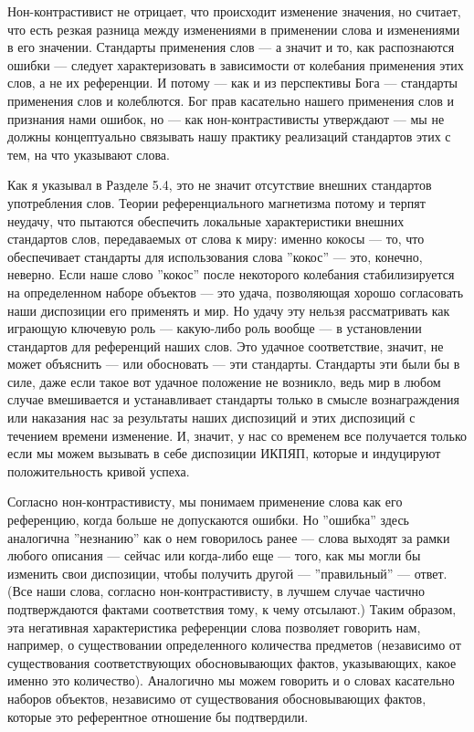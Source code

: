 \documentclass[11pt]{book}
\begin{document}
Нон-контрастивист не отрицает, что происходит изменение значения, но считает, что есть резкая разница между изменениями в применении слова и изменениями в его значении. Стандарты применения слов --- а значит и то, как распознаются ошибки --- следует характеризовать в зависимости от колебания применения этих слов, а не их референции. И потому --- как и из перспективы Бога --- стандарты применения слов и колеблются. Бог прав касательно нашего применения слов и признания нами ошибок, но --- как нон-контрастивисты утверждают --- мы не должны концептуально связывать нашу практику реализаций стандартов этих с тем, на что указывают слова.

Как я указывал в Разделе 5.4, это не значит отсутствие внешних стандартов употребления слов. Теории референциального магнетизма потому и терпят неудачу, что пытаются обеспечить локальные характеристики внешних стандартов слов, передаваемых от слова к миру: именно кокосы --- то, что обеспечивает стандарты для использования слова ''кокос'' --- это, конечно, неверно. Если наше слово ''кокос'' после некоторого колебания стабилизируется на определенном наборе объектов --- это удача, позволяющая хорошо согласовать наши диспозиции его применять и мир. Но удачу эту нельзя рассматривать как играющую ключевую роль --- какую-либо роль вообще --- в установлении стандартов для референций наших слов. Это удачное соответствие, значит, не может объяснить --- или обосновать --- эти стандарты. Стандарты эти были бы в силе, даже если такое вот удачное положение не возникло, ведь мир в любом случае вмешивается и устанавливает стандарты только в смысле вознаграждения или наказания нас за результаты наших диспозиций и этих диспозиций с течением времени изменение. И, значит, у нас со временем все получается только если мы можем вызывать в себе диспозиции ИКПЯП, которые и индуцируют положительность кривой успеха.

Согласно нон-контрастивисту, мы понимаем применение слова как его референцию, когда больше не допускаются ошибки. Но ''ошибка'' здесь аналогична ''незнанию'' как о нем говорилось ранее --- слова выходят за рамки любого описания --- сейчас или когда-либо еще --- того, как мы могли бы изменить свои диспозиции, чтобы получить другой --- ''правильный'' --- ответ. (Все наши слова, согласно нон-контрастивисту, в лучшем случае частично подтверждаются фактами соответствия тому, к чему отсылают.) Таким образом, эта негативная характеристика референции слова позволяет говорить нам, например, о существовании определенного количества предметов (независимо от существования соответствующих обосновывающих фактов, указывающих, какое именно это количество). Аналогично мы можем говорить и о словах касательно наборов объектов, независимо от существования обосновывающих фактов, которые это референтное отношение бы подтвердили.
\end{document}
